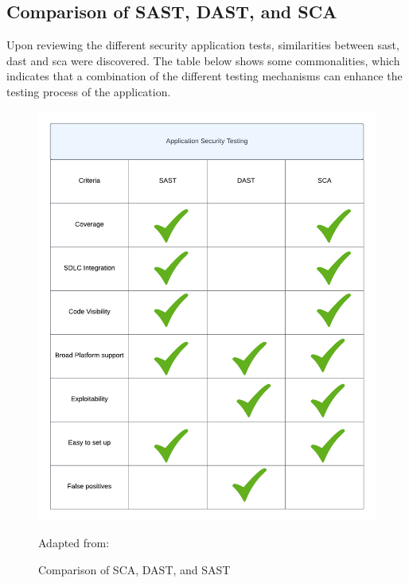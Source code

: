 \newpage
\subsection{Comparison of SAST, DAST, and SCA}
Upon reviewing the different security application tests, similarities between \acrshort{sast}, \acrshort{dast} and \acrshort{sca} were discovered. The table below shows some commonalities, which indicates that a combination of the different testing mechanisms can enhance the testing process of the application. 

\vspace{2mm}
\begin{figure}[H]
    \centering
    \includegraphics[width=0.8\columnwidth]{Images/ApplicationSecurityTesting.png}
    \caption{Comparison of SCA, DAST, and SAST}Adapted from: \cite{Comparison}
    \label{fig: Comparison of SCA, DAST, and SASt}
\end{figure}

